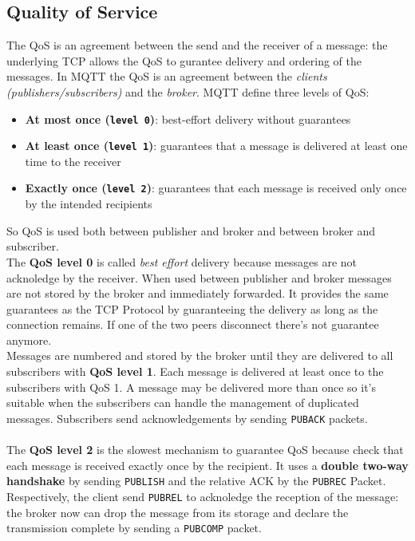 \documentclass[10pt,a4paper]{report}
\theoremstyle{definition}
\begin{document}
\subsection{Quality of Service}\label{sec:quality-of-service}
The QoS is an agreement between the send and the receiver of a message: the underlying TCP allows the QoS to gurantee delivery and ordering of the messages.
In MQTT the QoS is an agreement between the \textit{clients (publishers/subscribers)} and the \textit{broker}.
MQTT define three levels of QoS:
\begin{itemize}
	\item 
	\textbf{At most once (\texttt{level 0})}: best-effort delivery without guarantees
	\item 
	\textbf{At least once (\texttt{level 1})}: guarantees that a message is delivered at least one time to the receiver
	\item 
	\textbf{Exactly once (\texttt{level 2})}: guarantees that each message is received only once by the intended recipients
	
\end{itemize}
So QoS is used both between publisher and broker and between broker and subscriber.\\
The \textbf{QoS level 0} is called \textit{best effort} delivery because messages are not acknoledge by the receiver. When used between publisher and broker messages are not stored by the broker and immediately forwarded.
It provides the same guarantees as the TCP Protocol by guaranteeing the delivery as long as the connection remains. If one of the two peers disconnect there's not guarantee anymore.\\
Messages are numbered and stored by the broker until they are delivered to all subscribers with \textbf{QoS level 1}. Each message is delivered at least once to the subscribers with QoS 1. A message may be delivered more than once so it's suitable when the subscribers can handle the management of duplicated messages.
Subscribers send acknowledgements by sending \texttt{PUBACK} packets.\\\\
The \textbf{QoS level 2} is the slowest mechanism to guarantee QoS because check that each message is received exactly once by the recipient. It uses a \textbf{double two-way handshake} by sending \texttt{PUBLISH} and the relative ACK by the \texttt{PUBREC} Packet. Respectively, the client send \texttt{PUBREL} to acknoledge the reception of the message: the broker now can drop the message from its storage and declare the transmission complete by sending a \texttt{PUBCOMP} packet.\\
\end{document}
